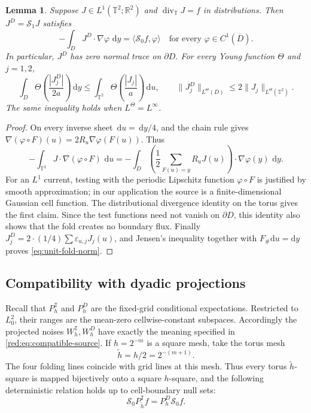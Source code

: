 \documentclass[11pt]{article}
\newtheorem{lemma}[lemma]{Lemma}
\theoremstyle{definition}
\theoremstyle{remark}
\numberwithin{equation}{section}
\newcommand{\T}{\mathbb T}
\newcommand{\dd}{\,\mathrm d}
\begin{document}
\begin{lemma}
\label{lem:unit-fold-current}
Suppose $J\in L^1(\T^2;\mathbb R^2)$ and
$\operatorname{div}_{\T}J=f$ in distributions. Then
$J^D=\mathscr S_1J$ satisfies
\[
 -\int_D J^D\cdot\nabla\varphi\,\dd y
 =\langle\mathscr S_0f,\varphi\rangle
 \quad\text{for every }\varphi\in C^1(\overline D).
\]
In particular, $J^D$ has zero normal trace on $\partial D$.
For every Young function $\Theta$ and $j=1,2$,
\begin{equation}
 \int_D\Theta\left(\frac{|J_j^D|}{2a}\right)\dd y
 \le\int_{\T^2}\Theta\left(\frac{|J_j|}{a}\right)\dd u,
 \qquad
 \|J_j^D\|_{L^\Theta(D)}\le2\|J_j\|_{L^\Theta(\T^2)}.
 \label{eq:unit-fold-norm}
\end{equation}
The same inequality holds when $L^\Theta=L^\infty$.
\end{lemma}
\begin{proof}
On every inverse sheet $\dd u=\dd y/4$, and the chain rule gives
$\nabla(\varphi\circ F)(u)=2R_u\nabla\varphi(F(u))$. Thus
\[
 -\int_{\T^2}J\cdot\nabla(\varphi\circ F)\,\dd u
 =-\int_D\left(\frac12\sum_{F(u)=y}R_uJ(u)\right)
 \cdot\nabla\varphi(y)\,\dd y.
\]
For an $L^1$ current, testing with the periodic Lipschitz function
$\varphi\circ F$ is justified by smooth approximation; in our application
the source is a finite-dimensional Gaussian cell function. The
distributional divergence identity on the torus gives the first claim.
Since the test functions need not vanish on $\partial D$, this identity
also shows that the fold creates no boundary flux. Finally
$J_j^D=2\cdot(1/4)\sum\varepsilon_{u,j}J_j(u)$, and Jensen's inequality
together with $F_\#\mathrm du=\mathrm dy$ proves \eqref{eq:unit-fold-norm}.
\end{proof}

\subsection{Compatibility with dyadic projections}
Recall that $P_h^{\T}$ and $P_h^D$ are the fixed-grid conditional
expectations. Restricted to $L_0^2$, their ranges are the mean-zero
cellwise-constant subspaces. Accordingly the projected noises
$W_h^{\T},W_h^D$ have exactly the meaning specified in
\eqref{red:eq:compatible-source}.
If $h=2^{-m}$ is a square mesh, take the torus mesh
\[
 \widetilde h=h/2=2^{-(m+1)}.
\]
The four folding lines coincide with grid lines at this mesh. Thus
every torus $\widetilde h$-square is mapped bijectively onto a square
$h$-square, and the following deterministic relation holds up to
cell-boundary null sets:
\begin{equation}
 \mathscr S_0P_{\widetilde h}^{\T}f
 =P_h^{D}\mathscr S_0f.
 \label{eq:commute-projections}
\end{equation}
\end{document}
